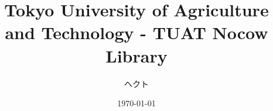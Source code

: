 \documentclass[9pt,twocolumn,a4paper,landscape]{extarticle}
\title{Tokyo University of Agriculture and Technology - TUAT Nocow Library}
\author{ヘクト}
\date{\today}
\begin{document}

\begin{comment}
\begin{center}
\begin{minipage}{4cm}
	\begin{verbatim}
	　　ＡＡ
	　⊂・・⊃▼⌒ヽ
	　(ω＿) )　 ●|〜*
	　　　ＵＵ〜ーＵ
	\end{verbatim}
\end{minipage}
\end{center}
\end{comment}



%








\end{document}
